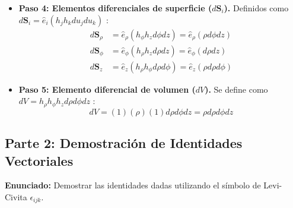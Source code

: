 \documentclass[a4paper]{article}
\begin{document}
\begin{itemize}
    \item \textbf{Paso 4: Elementos diferenciales de superficie ($d\mathbf{S}_i$).}
    Definidos como $d\mathbf{S}_i = \hat{e}_i (h_j h_k du_j du_k)$ \cite{70}:
    \begin{align*}
        d\mathbf{S}_\rho &= \hat{e}_\rho (h_\phi h_z d\phi dz) = \hat{e}_\rho (\rho d\phi dz) \\
        d\mathbf{S}_\phi &= \hat{e}_\phi (h_\rho h_z d\rho dz) = \hat{e}_\phi (d\rho dz) \\
        d\mathbf{S}_z &= \hat{e}_z (h_\rho h_\phi d\rho d\phi) = \hat{e}_z (\rho d\rho d\phi)
    \end{align*}

    \item \textbf{Paso 5: Elemento diferencial de volumen ($dV$).}
    Se define como $dV = h_\rho h_\phi h_z d\rho d\phi dz$ \cite{71}:
    \begin{equation*}
        dV = (1)(\rho)(1) d\rho d\phi dz = \rho d\rho d\phi dz
    \end{equation*}
\end{itemize}

\subsection*{Parte 2: Demostración de Identidades Vectoriales}
\textbf{Enunciado:} Demostrar las identidades dadas utilizando el símbolo de Levi-Civita $\epsilon_{ijk}$.
\end{document}
